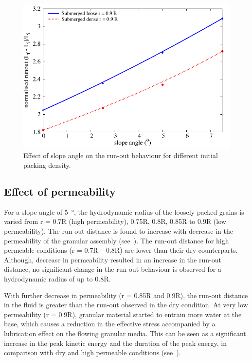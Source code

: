 \begin{figure}
\centering
\includegraphics[width=0.97\columnwidth]{slope_runout}
\caption{Effect of slope angle on the run-out behaviour for different initial 
packing density.}
\label{fig:slope_runout}
\end{figure}

\subsection{Effect of permeability}

For a slope angle of \SI{5}{\degree}, the hydrodynamic radius of the loosely 
packed grains is varied from r = 0.7R (high permeability), 0.75R, 0.8R, 0.85R 
to 0.9R (low permeability). The run-out distance is found to increase with 
decrease in the permeability of the granular assembly (see~). 
The run-out distance for high permeable conditions (r = 0.7R -- 0.8R) are 
lower than their dry counterparts. Although, decrease in permeability resulted 
in an increase in the run-out distance, no significant change in the run-out 
behaviour is observed for a hydrodynamic radius of up to 0.8R.

With further decrease in permeability (r = 0.85R and 0.9R), the run-out 
distance in the fluid is greater than the run-out observed in the dry 
condition. At very low permeability (r = 0.9R), granular material started to 
entrain more water at the base, which causes a reduction in the effective 
stress accompanied by a lubrication effect on the flowing granular media. This 
can be seen as a significant increase in the peak kinetic energy and the 
duration of the peak energy, in comparison with dry and high permeable 
conditions (see~).

